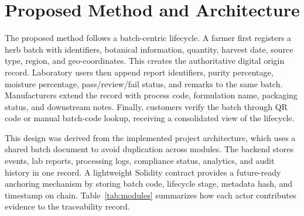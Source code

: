 \documentclass[conference]{IEEEtran}
\begin{document}
\section{Proposed Method and Architecture}
The proposed method follows a batch-centric lifecycle. A farmer first registers a herb batch with identifiers, botanical information, quantity, harvest date, source type, region, and geo-coordinates. This creates the authoritative digital origin record. Laboratory users then append report identifiers, purity percentage, moisture percentage, pass/review/fail status, and remarks to the same batch. Manufacturers extend the record with process code, formulation name, packaging status, and downstream notes. Finally, customers verify the batch through QR code or manual batch-code lookup, receiving a consolidated view of the lifecycle.

This design was derived from the implemented project architecture, which uses a shared batch document to avoid duplication across modules. The backend stores events, lab reports, processing logs, compliance status, analytics, and audit history in one record. A lightweight Solidity contract provides a future-ready anchoring mechanism by storing batch code, lifecycle stage, metadata hash, and timestamp on chain. Table~\ref{tab:modules} summarizes how each actor contributes evidence to the traceability record.

\begin{table}[!t]
\caption{Role-wise Traceability Functions in the Proposed System}
\label{tab:modules}
\centering
{}
\end{table}
\end{document}

